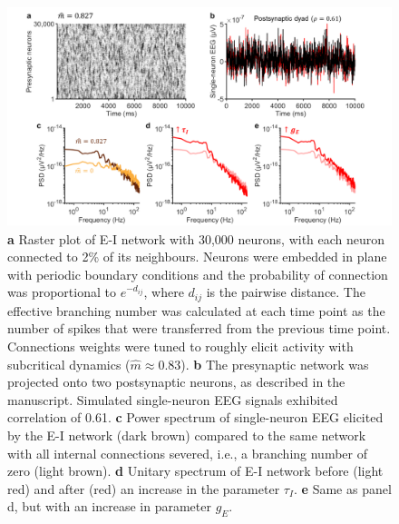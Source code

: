 \begin{figure}[t]
\centering
\includegraphics[width=14cm]{Figures/Discussion/subcritical_network.png}
\caption{
\textbf{a} Raster plot of E-I network with 30,000 neurons, with each neuron connected to 2\% of its neighbours. Neurons were embedded in plane with periodic boundary conditions and the probability of connection was proportional to $e^{-d_{ij}}$, where $d_{ij}$ is the pairwise distance. The effective branching number was calculated at each time point as the number of spikes that were transferred from the previous time point. Connections weights were tuned to roughly elicit activity with subcritical dynamics ($\hat{m}\approx0.83$).
\textbf{b} The presynaptic network was projected onto two postsynaptic neurons, as described in the manuscript. Simulated single-neuron EEG signals exhibited correlation of 0.61. 
\textbf{c} Power spectrum of single-neuron EEG elicited by the E-I network (dark brown) compared to the same network with all internal connections severed, i.e., a branching number of zero (light brown).
\textbf{d} Unitary spectrum of E-I network before (light red) and after (red) an increase in the parameter $\tau_I$. 
\textbf{e} Same as panel d, but with an increase in parameter $g_E$.}
\label{fig:EI_crit}
\end{figure}

